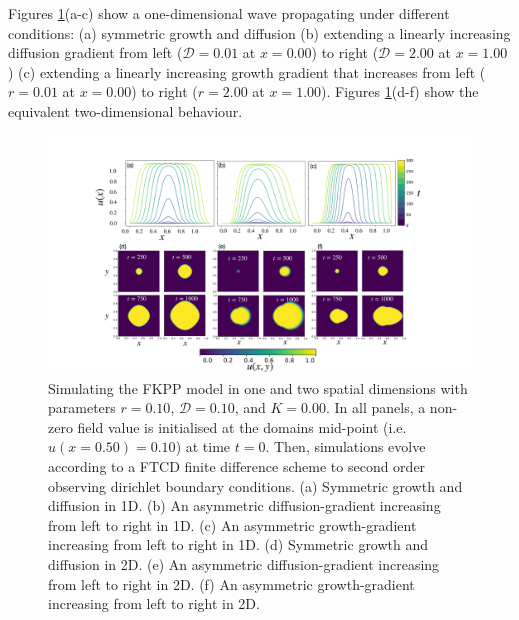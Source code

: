 Figures \ref{fig:fkpp}(a-c) show a one-dimensional wave propagating under different conditions:
(a) symmetric growth and diffusion
(b) extending a linearly increasing diffusion gradient from left ($\mathcal{D}=0.01$ at $x=0.00$) to right
($\mathcal{D}=2.00$ at $x=1.00$)
(c) extending a linearly increasing growth gradient that increases from left ($r=0.01$ at $x=0.00$) to right
($r=2.00$ at $x=1.00$).
Figures \ref{fig:fkpp}(d-f) show the equivalent two-dimensional behaviour.

\begin{figure}
    \centering
    \includegraphics[scale=0.325]{chapter2/figures/FKPP.pdf}
    \caption{
    Simulating the FKPP model in one and two spatial dimensions with parameters $r=0.10$, $\mathcal{D}=0.10$, and $K=0.00$. 
    In all panels, a non-zero field value is initialised at the domains mid-point (i.e. $u(x=0.50) = 0.10$) at time $t=0$.
    Then, simulations evolve according to a FTCD finite difference scheme to second order observing dirichlet boundary conditions. 
    (a) Symmetric growth and diffusion in 1D.
    (b) An asymmetric diffusion-gradient increasing from left to right in 1D.
    (c) An asymmetric growth-gradient increasing from left to right in 1D.
    (d) Symmetric growth and diffusion in 2D.
    (e) An asymmetric diffusion-gradient increasing from left to right in 2D.
    (f) An asymmetric growth-gradient increasing from left to right in 2D.}
    \label{fig:fkpp}
\end{figure}

